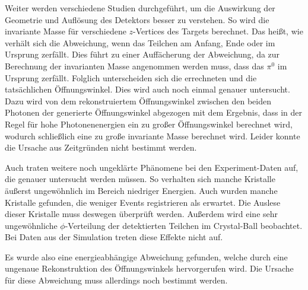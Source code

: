 \documentclass[a4paper,11pt,oneside,final,german,openbib,pdftex]{scrbook}
\begin{document}
{%



Weiter werden verschiedene Studien durchgef\"uhrt, um die Auswirkung der Geometrie und Aufl\"osung des Detektors besser zu verstehen. So wird die invariante Masse f\"ur verschiedene $z$-Vertices des Targets berechnet. Das hei{\ss}t, wie verh\"alt sich die Abweichung, wenn das Teilchen am Anfang, Ende oder im Ursprung zerf\"allt. Dies f\"uhrt zu einer Auff\"acherung der Abweichung, da zur Berechnung der invarianten Masse angenommen werden muss, dass das $\pi^0$ im Ursprung zerf\"allt. Folglich unterscheiden sich die errechneten und die tats\"achlichen \"Offnungswinkel. Dies wird auch noch einmal genauer untersucht. Dazu wird von dem rekonstruiertem \"Offnungswinkel zwischen den beiden Photonen der generierte \"Offnungswinkel abgezogen mit dem Ergebnis, dass in der Regel für hohe Photonenenergien ein zu großer Öffnungswinkel berechnet wird, wodurch schließlich eine zu große invariante Masse berechnet wird. Leider konnte die Ursache aus Zeitgr\"unden nicht bestimmt werden.
\newline

Auch traten weitere noch ungekl\"arte Phänomene bei den Experiment-Daten auf, die genauer untersucht werden m\"ussen. So verhalten sich manche Kristalle \"au{\ss}erst ungew\"ohnlich im Bereich niedriger Energien. Auch wurden manche Kristalle gefunden, die weniger Events registrieren als erwartet. Die Auslese dieser Kristalle muss deswegen \"uberpr\"uft werden. 
Au{\ss}erdem wird eine sehr ungew\"ohnliche $\phi$-Verteilung der detektierten Teilchen im Crystal-Ball beobachtet.
Bei Daten aus der Simulation treten diese Effekte nicht auf.
\newline

Es wurde also eine energieabh\"angige Abweichung gefunden, welche durch eine ungenaue Rekonstruktion des \"Offnungswinkels hervorgerufen wird. Die Ursache f\"ur diese Abweichung muss allerdings noch bestimmt werden.



}
\end{document}
